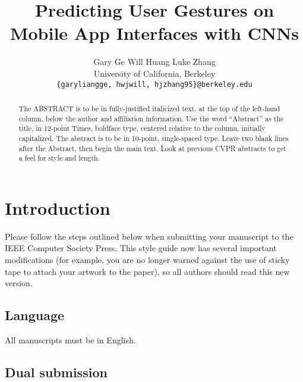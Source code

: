 \documentclass[10pt,twocolumn,letterpaper]{article}
\begin{document}
\title{Predicting User Gestures on Mobile App
Interfaces with CNNs}

\author{Gary Ge \qquad Will Huang \qquad Luke Zhang\\
University of California, Berkeley\\
{\tt\small \{garyliangge, hwjwill, hjzhang95\}@berkeley.edu}
}

\maketitle

\begin{abstract}
   The ABSTRACT is to be in fully-justified italicized text, at the top
   of the left-hand column, below the author and affiliation
   information. Use the word ``Abstract'' as the title, in 12-point
   Times, boldface type, centered relative to the column, initially
   capitalized. The abstract is to be in 10-point, single-spaced type.
   Leave two blank lines after the Abstract, then begin the main text.
   Look at previous CVPR abstracts to get a feel for style and length.
\end{abstract}

\section{Introduction}

Please follow the steps outlined below when submitting your manuscript to
the IEEE Computer Society Press.  This style guide now has several
important modifications (for example, you are no longer warned against the
use of sticky tape to attach your artwork to the paper), so all authors
should read this new version.

\subsection{Language}

All manuscripts must be in English.

\subsection{Dual submission}
\end{document}
